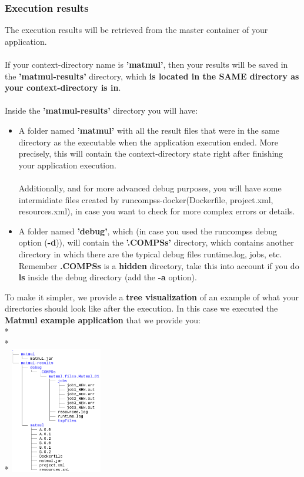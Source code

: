 \subsubsection{Execution results}
The execution results will be retrieved from the master container of your application.
\\ \\ 
If your context-directory name is \textbf{'matmul'}, then your results will be saved in the \textbf{'matmul-results'} directory, 
which \textbf{is located in the SAME directory as your context-directory is in}. 
\\ \\ 
Inside the \textbf{'matmul-results'} directory you will have:
\begin{itemize}
 \item  A folder named \textbf{'matmul'} with all the result files that were
	in the same directory as the executable when the application execution ended.  
	More precisely, this will contain the context-directory state right after finishing your application execution.
	\\
	\\
	Additionally, and for more advanced debug purposes,
	you will have some intermidiate files created by runcompss-docker(Dockerfile, project.xml, resources.xml),
	in case you want to check for more complex errors or details. 
	
	
  \item A folder named \textbf{'debug'}, which (in case you used the runcompss debug option (\textbf{-d})), 
        will contain the \textbf{'.COMPSs'} directory, which contains another directory in which there are the typical debug files runtime.log, jobs, etc.
	\\
        Remember \textbf{.COMPSs} is a \textbf{hidden} directory, take this into account if you do \textbf{ls} inside the debug directory (add the \textbf{-a} option).
  
\end{itemize}

To make it simpler, we provide a \textbf{tree visualization} of an example of what your directories should look like after the execution.
In this case we executed the \textbf{Matmul example application} that we provide you:
\\*
\\*
\\*
\includegraphics[width=0.3\textwidth]{./Sections/5_Execution_Platforms/Figures/docker-matmul-results-tree.png} 

